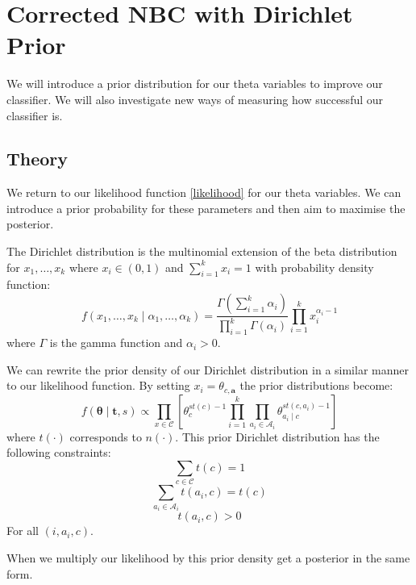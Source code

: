 \chapter{Corrected NBC with Dirichlet Prior}

We will introduce a prior distribution for our theta variables to improve our classifier.
We will also investigate new ways of measuring how successful our classifier is.

\section{Theory}

We return to our likelihood function \cref{likelihood} for our theta variables.
We can introduce a prior probability for these parameters and then aim to maximise the posterior.

The Dirichlet distribution is the multinomial extension of the beta distribution for $x_1,\dots,x_k$ where $x_i \in (0,1)$ and $\sum_{i=1}^k x_i = 1$ with probability density function:
\begin{equation} \label{dirichlet_pdf}
	f(x_1,\dots,x_k \mid \alpha_1,\dots,\alpha_k) = \frac{\Gamma(\sum_{i=1}^k\alpha_i)}{\prod_{i=1}^k\Gamma(\alpha_i)} \prod_{i=1}^k x_i^{\alpha_i - 1}
\end{equation}
where $\Gamma$ is the gamma function and $\alpha_i > 0$.

We can rewrite the prior density of our Dirichlet distribution in a similar manner to our likelihood function.
By setting $x_i = \theta_{c,\mathbf{a}}$ the prior distributions become:
\begin{equation} \label{prior}
	f(\mathbf{\theta} \mid \mathbf{t}, s) \propto \prod_{x \in \mathcal{C}} \left[ \theta_c^{st(c) - 1} \prod_{i=1}^k \prod_{a_i \in \mathcal{A}_i} \theta_{a_i \mid c}^{st(c, a_i) - 1} \right]
\end{equation}
where $t(\cdot)$ corresponds to $n(\cdot)$.
This prior Dirichlet distribution \cite{Zaffalon01} has the following constraints:
\begin{equation}
	\sum_{c \in \mathcal{C}} t(c) = 1
\end{equation}
\begin{equation}
	\sum_{a_i \in \mathcal{A}_i} t(a_i, c) = t(c)
\end{equation}
\begin{equation}
	t(a_i, c) > 0
\end{equation}
For all $(i, a_i, c)$.

When we multiply our likelihood by this prior density get a posterior in the same form.